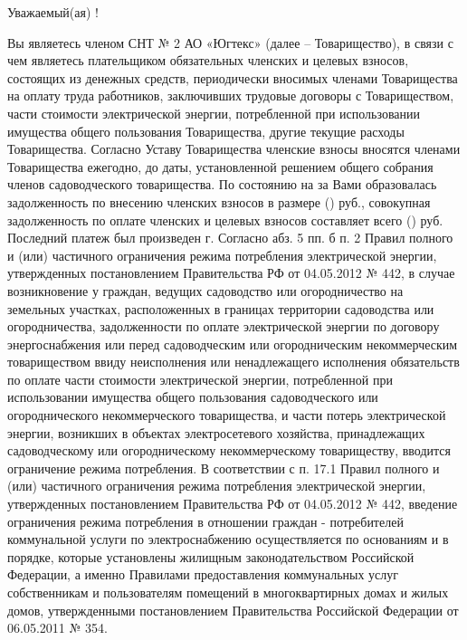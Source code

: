 \begin{center}
	Уважаемый(ая) \textbf{ }!
\end{center}
\vspace{-3mm} Вы являетесь членом СНТ № 2 АО «Югтекс» (далее – Товарищество), в связи с чем являетесь плательщиком обязательных членских и целевых взносов, состоящих из денежных средств, периодически вносимых членами Товарищества на оплату труда работников, заключивших трудовые договоры с Товариществом, части стоимости электрической энергии, потребленной при использовании имущества общего пользования Товарищества, %
другие текущие расходы Товарищества. 
Согласно Уставу Товарищества членские взносы вносятся членами Товарищества
ежегодно, до даты, установленной решением общего собрания членов садоводческого товарищества.
По состоянию на  за Вами образовалась задолженность по внесению членских взносов в размере  ()  руб., совокупная задолженность по оплате членских и целевых взносов составляет всего  () руб. Последний платеж был произведен  г.
Согласно абз. 5 пп. б п. 2 Правил полного и (или) частичного ограничения режима потребления электрической энергии, утвержденных постановлением Правительства РФ от 04.05.2012 № 442, в случае возникновение у граждан, ведущих садоводство или огородничество на земельных участках, расположенных в границах территории садоводства или огородничества, задолженности по оплате электрической энергии по договору энергоснабжения или перед садоводческим или огородническим некоммерческим товариществом ввиду неисполнения или ненадлежащего исполнения обязательств по оплате части стоимости электрической энергии, потребленной при использовании имущества общего пользования садоводческого или огороднического некоммерческого товарищества, и части потерь электрической энергии, возникших в объектах электросетевого хозяйства, принадлежащих садоводческому или огородническому некоммерческому товариществу, вводится ограничение режима потребления.
В соответствии с п. 17.1 Правил полного и (или) частичного ограничения режима потребления электрической энергии, утвержденных постановлением Правительства РФ от 04.05.2012 № 442, введение ограничения режима потребления в отношении граждан - потребителей коммунальной услуги по электроснабжению осуществляется по основаниям и в порядке, которые установлены жилищным законодательством Российской Федерации, а именно Правилами предоставления коммунальных услуг собственникам и пользователям помещений в многоквартирных домах и жилых домов, утвержденными постановлением Правительства Российской Федерации от 06.05.2011 № 354.
